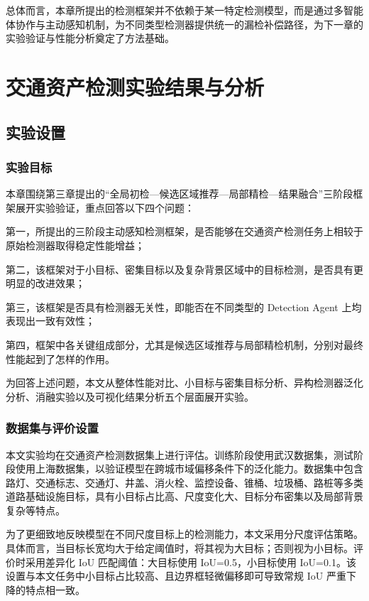总体而言，本章所提出的检测框架并不依赖于某一特定检测模型，而是通过多智能体协作与主动感知机制，为不同类型检测器提供统一的漏检补偿路径，为下一章的实验验证与性能分析奠定了方法基础。

\chapter{交通资产检测实验结果与分析}
\label{chap:experiments}

\section{实验设置}
\label{sec:exp_setup}

\subsection{实验目标}
\label{subsec:exp_goal}

本章围绕第三章提出的“全局初检—候选区域推荐—局部精检—结果融合”三阶段框架展开实验验证，重点回答以下四个问题：

第一，所提出的三阶段主动感知检测框架，是否能够在交通资产检测任务上相较于原始检测器取得稳定性能增益；

第二，该框架对于小目标、密集目标以及复杂背景区域中的目标检测，是否具有更明显的改进效果；

第三，该框架是否具有检测器无关性，即能否在不同类型的 Detection Agent 上均表现出一致有效性；

第四，框架中各关键组成部分，尤其是候选区域推荐与局部精检机制，分别对最终性能起到了怎样的作用。

为回答上述问题，本文从整体性能对比、小目标与密集目标分析、异构检测器泛化分析、消融实验以及可视化结果分析五个层面展开实验。

\subsection{数据集与评价设置}
\label{subsec:dataset_metric_setting}

本文实验均在交通资产检测数据集上进行评估。训练阶段使用武汉数据集，测试阶段使用上海数据集，以验证模型在跨城市域偏移条件下的泛化能力。数据集中包含路灯、交通标志、交通灯、井盖、消火栓、监控设备、锥桶、垃圾桶、路桩等多类道路基础设施目标，具有小目标占比高、尺度变化大、目标分布密集以及局部背景复杂等特点。

为了更细致地反映模型在不同尺度目标上的检测能力，本文采用分尺度评估策略。具体而言，当目标长宽均大于给定阈值时，将其视为大目标；否则视为小目标。评价时采用差异化 IoU 匹配阈值：大目标使用 IoU=0.5，小目标使用 IoU=0.1。该设置与本文任务中小目标占比较高、且边界框轻微偏移即可导致常规 IoU 严重下降的特点相一致。

